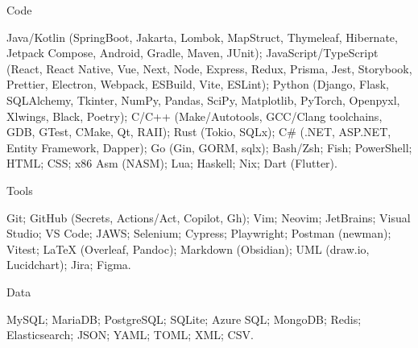 \documentclass[10pt, a4paper]{russell}
\begin{document}
\makecvheader
\makecvfooter{\today}{}{\thepage}

\begin{cvskills}

    \cvskill
        {Code}
        {\parbox[t]{0.99\linewidth}{
            Java/Kotlin (SpringBoot, Jakarta, Lombok, MapStruct, Thymeleaf, Hibernate, Jetpack Compose, Android, Gradle, Maven, JUnit); 
            JavaScript/TypeScript (React, React Native, Vue, Next, Node, Express, Redux, Prisma, Jest, Storybook, Prettier, Electron, Webpack, ESBuild, Vite, ESLint); 
            Python (Django, Flask, SQLAlchemy, Tkinter, NumPy, Pandas, SciPy, Matplotlib, PyTorch, Openpyxl, Xlwings, Black, Poetry);
            C/C++ (Make/Autotools, GCC/Clang toolchains, GDB, GTest, CMake, Qt, RAII);
            Rust (Tokio, SQLx);
            C\# (.NET, ASP.NET, Entity Framework, Dapper); 
            Go (Gin, GORM, sqlx);
            Bash/Zsh;
            Fish;
            PowerShell;
            HTML;
            CSS;
            x86 Asm (NASM);
            Lua;
            Haskell;
            Nix;
            Dart (Flutter).
        }}

    \cvskill
        {Tools}
        {\parbox[t]{0.99\linewidth}{
            Git;  
            GitHub (Secrets, Actions/Act, Copilot, Gh);  
            Vim;  
            Neovim;  
            JetBrains;  
            Visual Studio;  
            VS Code;  
            JAWS;  
            Selenium;  
            Cypress;  
            Playwright;  
            Postman (newman);  
            Vitest;    
            LaTeX (Overleaf, Pandoc);  
            Markdown (Obsidian);  
            UML (draw.io, Lucidchart);  
            Jira;  
            Figma.
        }}

    \cvskill
        {Data}
        {\parbox[t]{0.99\linewidth}{
            MySQL;
            MariaDB;  
            PostgreSQL;  
            SQLite;  
            Azure SQL;
            MongoDB;  
            Redis;
            Elasticsearch;
            JSON;  
            YAML;  
            TOML;  
            XML;  
            CSV.
        }}


\end{cvskills}
\end{document}
